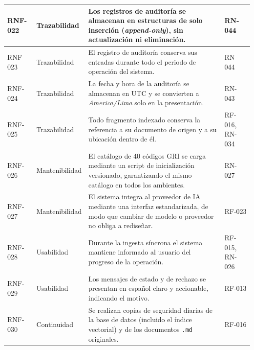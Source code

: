 \begin{longtable}{|C{1.7cm}|L{2.9cm}|L{6.4cm}|L{3.4cm}|}
\hline
RNF-022 & Trazabilidad & Los registros de auditoría se almacenan en estructuras de solo inserción (\emph{append-only}), sin actualización ni eliminación. & RN-044 \\
\hline
RNF-023 & Trazabilidad & El registro de auditoría conserva sus entradas durante todo el periodo de operación del sistema. & RN-044 \\
\hline
RNF-024 & Trazabilidad & La fecha y hora de la auditoría se almacenan en UTC y se convierten a \emph{America/Lima} solo en la presentación. & RN-043 \\
\hline
RNF-025 & Trazabilidad & Todo fragmento indexado conserva la referencia a su documento de origen y a su ubicación dentro de él. & RF-016, RN-034 \\
\hline
RNF-026 & Mantenibilidad & El catálogo de 40 códigos GRI se carga mediante un script de inicialización versionado, garantizando el mismo catálogo en todos los ambientes. & RN-027 \\
\hline
RNF-027 & Mantenibilidad & El sistema integra al proveedor de IA mediante una interfaz estandarizada, de modo que cambiar de modelo o proveedor no obliga a rediseñar. & RF-023 \\
\hline
RNF-028 & Usabilidad & Durante la ingesta síncrona el sistema mantiene informado al usuario del progreso de la operación. & RF-015, RN-026 \\
\hline
RNF-029 & Usabilidad & Los mensajes de estado y de rechazo se presentan en español claro y accionable, indicando el motivo. & RF-013 \\
\hline
RNF-030 & Continuidad & Se realizan copias de seguridad diarias de la base de datos (incluido el índice vectorial) y de los documentos \texttt{.md} originales. & RF-016 \\
\hline
\end{longtable}
